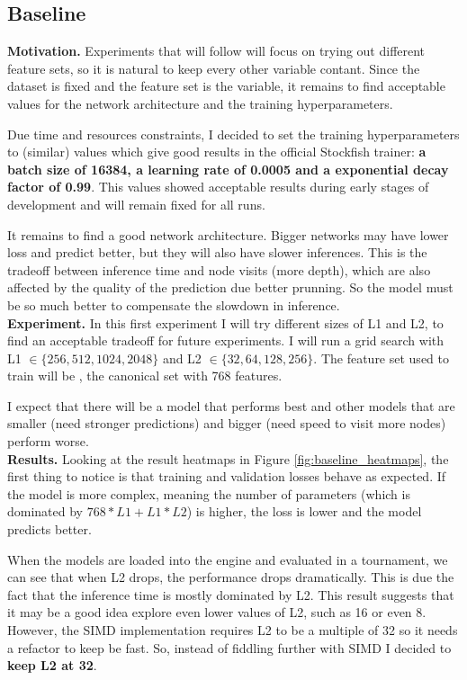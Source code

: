 \subsection{Baseline}

\textbf{Motivation.} Experiments that will follow will focus on trying out different feature sets, so it is natural to keep every other variable contant. Since the dataset is fixed and the feature set is the variable, it remains to find acceptable values for the network architecture and the training hyperparameters. 

Due time and resources constraints, I decided to set the training hyperparameters to   (similar) values which give good results in the official Stockfish trainer: \textbf{a batch size of 16384, a learning rate of 0.0005 and a exponential decay factor of 0.99}. This values showed acceptable results during early stages of development and will remain fixed for all runs.

It remains to find a good network architecture. Bigger networks may have lower loss and predict better, but they will also have slower inferences. This is the tradeoff between inference time and node visits (more depth), which are also affected by the quality of the prediction due better prunning. So the model must be so much better to compensate the slowdown in inference. \\

\textbf{Experiment.}  In this first experiment I will try different sizes of L1 and L2,  to find an acceptable tradeoff for future experiments. I will run a grid search with L1 $\in \{256, 512, 1024, 2048\}$ and L2 $\in \{32, 64, 128, 256\}$. The feature set used to train will be , the canonical set with 768 features.

I expect that there will be a model that performs best and other models that are smaller (need stronger predictions) and bigger (need speed to visit more nodes) perform worse. \\

\textbf{Results.} Looking at the result heatmaps in Figure \ref{fig:baseline_heatmaps}, the first thing to notice is that training and validation losses behave as expected. If the model is more complex, meaning the number of parameters (which is dominated by $768*L1+L1*L2$) is higher, the loss is lower and the model predicts better.

When the models are loaded into the engine and evaluated in a tournament, we can see that when L2 drops, the performance drops dramatically. This is due the fact that the inference time is mostly dominated by L2. This result suggests that it may be a good idea explore even lower values of L2, such as 16 or even 8. However, the SIMD implementation requires L2 to be a multiple of 32 so it needs a refactor to keep be fast. So, instead of fiddling further with SIMD I decided to \textbf{keep L2 at 32}.

